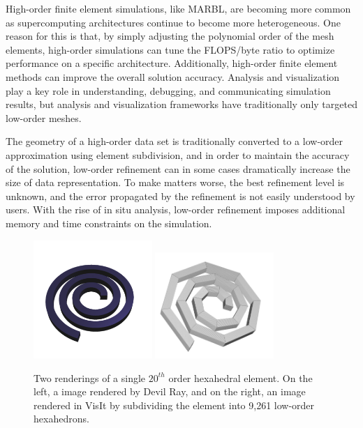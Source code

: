 High-order finite element simulations, like MARBL, are becoming more
common as supercomputing architectures continue to become more
heterogeneous.
%
One reason for this is that, by simply adjusting the polynomial order
of the mesh elements, high-order simulations
can tune the FLOPS/byte ratio to optimize performance on a specific architecture.
%
Additionally, high-order finite element methods can improve the overall solution accuracy.
%
Analysis and visualization play a key role in understanding, debugging,
and communicating simulation results, but analysis and visualization frameworks
have traditionally only targeted low-order meshes.
%

The geometry of a high-order data set is traditionally converted
to a low-order approximation using element subdivision, and in order
to maintain the accuracy of the solution, low-order refinement can
in some cases dramatically increase the size of data representation.
%
To make matters worse, the best refinement level is unknown,
and the error propagated by the refinement is not easily understood by users.
%
With the rise of in situ analysis, low-order refinement imposes additional memory
and time constraints on the simulation.
%

\begin{figure}
\centering
\includegraphics[width=0.4\textwidth]{images/dray_crazy}
\includegraphics[width=0.4\textwidth]{images/visit_crazy}
\caption{\label{img:crazy_hex} Two renderings of a single $20^{th}$ order hexahedral element.
On the left, a image rendered by Devil Ray, and on the right, an image rendered
in VisIt by subdividing the element into
9,261 low-order hexahedrons.}
\end{figure}

